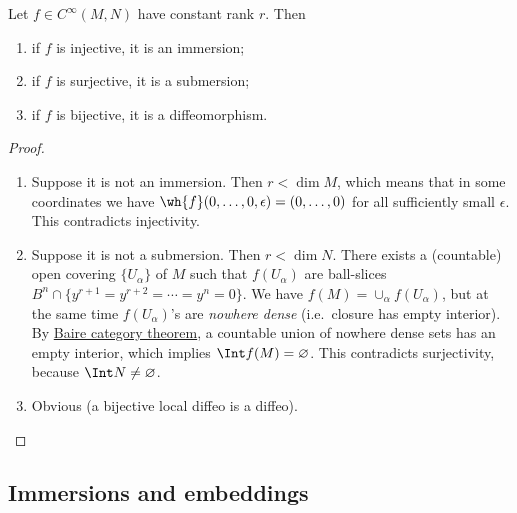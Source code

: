 \begin{thm}\label{Global rank}
Let $f\in C^\infty(M,N)$ have constant rank $r$. Then
\begin{enumerate}
    \item if $f$ is injective, it is an immersion;
    \item if $f$ is surjective, it is a submersion;
    \item if $f$ is bijective, it is a diffeomorphism.
\end{enumerate}
\end{thm}
\begin{proof}
\begin{enumerate}
    \item Suppose it is not an immersion. Then $r<\dim M$, which means that in some coordinates we have $\wh{f}(0,\ldots,0,\epsilon)=(0,\ldots,0)$ for all sufficiently small $\epsilon$. This contradicts injectivity.
    \item Suppose it is not a submersion. Then $r<\dim N$. There exists a (countable) open covering  $\{U_\alpha\}$ of $M$ such that $f(U_\alpha)$ are ball-slices $B^n\cap \{y^{r+1}=y^{r+2}=\cdots=y^n=0\}$. We have $f(M)=\cup_\alpha f(U_\alpha)$, but at the same time $f(U_\alpha)$'s are \emph{nowhere dense} (i.e.\ closure has empty interior). By \href{https://en.wikipedia.org/wiki/Baire_category_theorem}{Baire category theorem}, a countable union of nowhere dense sets has an empty interior, which implies $\Int  f(M)=\varnothing$. This contradicts surjectivity, because $\Int  N\neq\varnothing$.
    \item Obvious (a bijective local diffeo is a diffeo).
\end{enumerate}
\end{proof}



\subsection{Immersions and embeddings}

